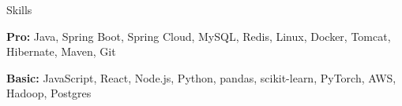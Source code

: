 \documentclass{resume} %
\begin{document}
\begin{skillSection}{Skills}
\item {\bf Pro:} Java, Spring Boot, Spring Cloud, MySQL, Redis, Linux, Docker, Tomcat, Hibernate, Maven, Git
\item {\bf Basic:} JavaScript, React, Node.js, Python, pandas, scikit-learn, PyTorch, AWS, Hadoop, Postgres
\end{skillSection}
\end{document}
